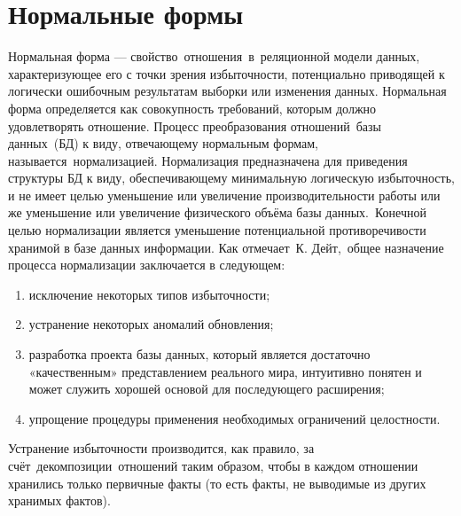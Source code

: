 \section{Нормальные формы}
Нормальная форма — свойство отношения в реляционной модели данных, характеризующее его с точки зрения избыточности, потенциально приводящей к логически ошибочным результатам выборки или изменения данных. Нормальная форма определяется как совокупность требований, которым должно удовлетворять отношение.
Процесс преобразования отношений базы данных (БД) к виду, отвечающему нормальным формам, называется нормализацией. Нормализация предназначена для приведения структуры БД к виду, обеспечивающему минимальную логическую избыточность, и не имеет целью уменьшение или увеличение производительности работы или же уменьшение или увеличение физического объёма базы данных. Конечной целью нормализации является уменьшение потенциальной противоречивости хранимой в базе данных информации. Как отмечает К. Дейт, общее назначение процесса нормализации заключается в следующем:
\begin{enumerate}

	\item исключение некоторых типов избыточности;
	\item устранение некоторых аномалий обновления;
	\item разработка проекта базы данных, который является достаточно «качественным» представлением реального мира, интуитивно понятен и может служить хорошей основой для последующего расширения;
	\item упрощение процедуры применения необходимых ограничений целостности.

\end{enumerate}
Устранение избыточности производится, как правило, за счёт декомпозиции отношений таким образом, чтобы в каждом отношении хранились только первичные факты (то есть факты, не выводимые из других хранимых фактов)\cite{book6}.

